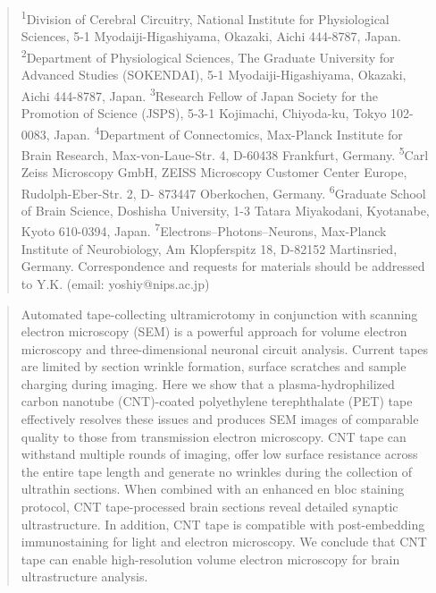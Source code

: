 \documentclass{article}
\begin{document}
\begin{quote}\small
\noindent \textsuperscript{1}Division of Cerebral Circuitry, National Institute for Physiological Sciences, 5-1 Myodaiji-Higashiyama, Okazaki, Aichi 444-8787, Japan. \textsuperscript{2}Department of Physiological Sciences, The Graduate University for Advanced Studies (SOKENDAI), 5-1 Myodaiji-Higashiyama, Okazaki, Aichi 444-8787, Japan. \textsuperscript{3}Research Fellow of Japan Society for the Promotion of Science (JSPS), 5-3-1 Kojimachi, Chiyoda-ku, Tokyo 102-0083, Japan. \textsuperscript{4}Department of Connectomics, Max-Planck Institute for Brain Research, Max-von-Laue-Str. 4, D-60438 Frankfurt, Germany. \textsuperscript{5}Carl Zeiss Microscopy GmbH, ZEISS Microscopy Customer Center Europe, Rudolph-Eber-Str. 2, D- 873447 Oberkochen, Germany. \textsuperscript{6}Graduate School of Brain Science, Doshisha University, 1-3 Tatara Miyakodani, Kyotanabe, Kyoto 610-0394, Japan. \textsuperscript{7}Electrons–Photons–Neurons, Max-Planck Institute of Neurobiology, Am Klopferspitz 18, D-82152 Martinsried, Germany. Correspondence and requests for materials should be addressed to Y.K. (email: yoshiy@nips.ac.jp)
\end{quote}

\begin{quote}
Automated tape-collecting ultramicrotomy in conjunction with scanning electron microscopy (SEM) is a powerful approach for volume electron microscopy and three-dimensional neuronal circuit analysis. Current tapes are limited by section wrinkle formation, surface scratches and sample charging during imaging. Here we show that a plasma-hydrophilized carbon nanotube (CNT)-coated polyethylene terephthalate (PET) tape effectively resolves these issues and produces SEM images of comparable quality to those from transmission electron microscopy. CNT tape can withstand multiple rounds of imaging, offer low surface resistance across the entire tape length and generate no wrinkles during the collection of ultrathin sections. When combined with an enhanced en bloc staining protocol, CNT tape-processed brain sections reveal detailed synaptic ultrastructure. In addition, CNT tape is compatible with post-embedding immunostaining for light and electron microscopy. We conclude that CNT tape can enable high-resolution volume electron microscopy for brain ultrastructure analysis.
\end{quote}
\end{document}
